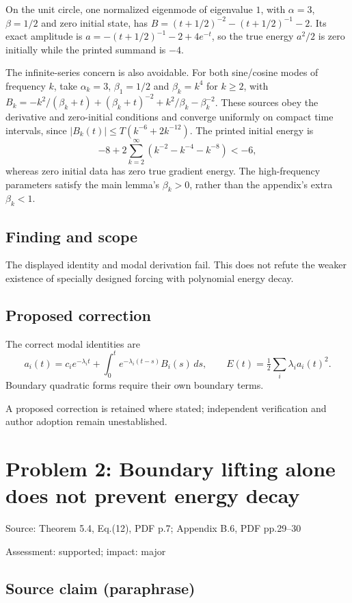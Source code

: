 \documentclass[11pt]{article}
\begin{document}
On the unit circle, one normalized eigenmode of eigenvalue \(1\), with \(\alpha=3\), \(\beta=1/2\) and zero initial state, has \(B=(t+1/2)^{-2}-(t+1/2)^{-1}-2\). Its exact amplitude is \(a=-(t+1/2)^{-1}-2+4e^{-t}\), so the true energy \(a^2/2\) is zero initially while the printed summand is \(-4\).

The infinite-series concern is also avoidable. For both sine/cosine modes of frequency \(k\), take \(\alpha_k=3\), \(\beta_1=1/2\) and \(\beta_k=k^4\) for \(k\ge2\), with \(B_k=-k^2/(\beta_k+t)+(\beta_k+t)^{-2}+k^2/\beta_k-\beta_k^{-2}\). These sources obey the derivative and zero-initial conditions and converge uniformly on compact time intervals, since \(|B_k(t)|\le T(k^{-6}+2k^{-12})\). The printed initial energy is \[-8+2\sum_{k=2}^{\infty}(k^{-2}-k^{-4}-k^{-8})<-6,\] whereas zero initial data has zero true gradient energy. The high-frequency parameters satisfy the main lemma’s \(\beta_k>0\), rather than the appendix’s extra \(\beta_k<1\).

\subsection*{Finding and scope}

The displayed identity and modal derivation fail. This does not refute the weaker existence of specially designed forcing with polynomial energy decay.

\subsection*{Proposed correction}

The correct modal identities are \[a_i(t)=c_i e^{-\lambda_i t}+\int_0^t e^{-\lambda_i(t-s)}B_i(s)\,ds,\qquad E(t)=\tfrac12\sum_i\lambda_i a_i(t)^2.\] Boundary quadratic forms require their own boundary terms.

A proposed correction is retained where stated; independent verification and author adoption remain unestablished.

\section*{Problem 2: Boundary lifting alone does not prevent energy decay}

Source: Theorem 5.4, Eq.(12), PDF p.7; Appendix B.6, PDF pp.29–30

Assessment: supported; impact: major

\subsection*{Source claim (paraphrase)}
\end{document}
